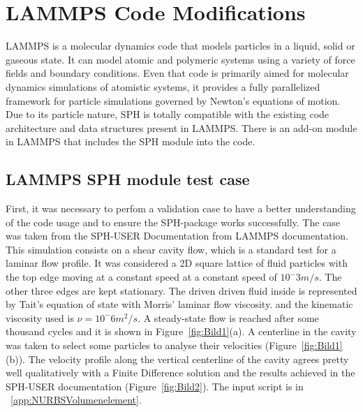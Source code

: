
\chapter{LAMMPS Code Modifications}
\label{chap:chapter_3}

LAMMPS is a molecular dynamics code that models particles in a liquid, solid or gaseous state\cite{lammps_manual}. It can model atomic and polymeric systems using a variety of force fields and
boundary conditions. Even that code is primarily aimed for molecular dynamics simulations of atomistic systems, it provides a fully parallelized framework for particle simulations
governed by Newton's equations of motion. Due to its particle nature, SPH is totally compatible with the existing code architecture and data structures present in LAMMPS. There is 
an add-on module in LAMMPS that includes the SPH module into the code.\par

\section{LAMMPS SPH module test case}
\label{sec:section_1}

First, it was necessary to perfom a validation case to have a better understanding of the code usage and to ensure the SPH-package works successfully. The case was taken from 
the SPH-USER Documentation from LAMMPS documentation\cite{ganzenmuller_implementation_2011}. This simulation consists on a shear cavity flow, which is a standard test for a laminar
flow profile. It was considered a 2D square lattice of fluid particles with the top edge moving at a constant speed at a constant speed of $10^-3m/s$. The other three edges are kept
stationary. The driven driven fluid inside is represented by Tait's equation of state \cite{neece_tait_1968} with Morris' laminar flow viscosity. and the kinematic viscosity used is
$\nu=10^-6m^2/s$. A steady-state flow is reached after some thousand cycles and it is shown in Figure~\ref{fig:Bild1}(a). A centerline in the cavity was taken to select some particles
to analyse their velocities (Figure~\ref{fig:Bild1}(b)). The velocity profile along the vertical centerline of the cavity 
agrees pretty well qualitatively with a Finite Difference solution and the results achieved in the SPH-USER documentation (Figure~\ref{fig:Bild2}). The input script is in ~\ref{app:NURBSVolumenelement}.


